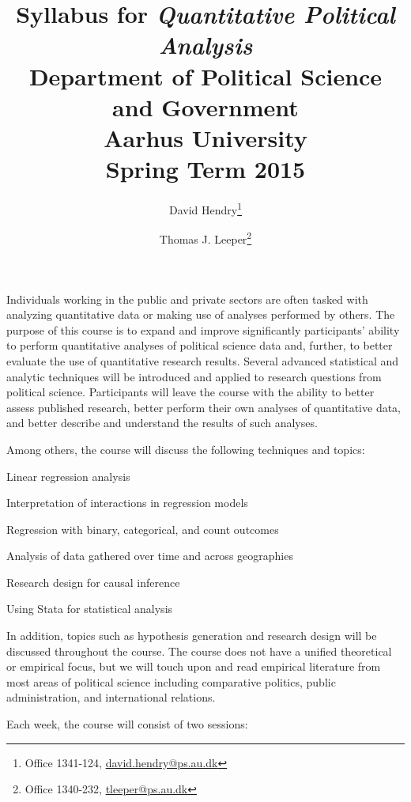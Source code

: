 \documentclass[11pt,a4paper]{article}
\title{Syllabus for \textit{Quantitative Political Analysis}\\Department of Political Science and Government\\Aarhus University\\Spring Term 2015}
\author{David Hendry\thanks{Office 1341-124, \href{mailto:david.hendry@ps.au.dk}{david.hendry@ps.au.dk}} \and
Thomas J. Leeper\thanks{Office 1340-232, \href{mailto:tleeper@ps.au.dk}{tleeper@ps.au.dk}}}
\begin{document}
\nobibliography*

\maketitle

\faketableofcontents


Individuals working in the public and private sectors are often tasked with analyzing quantitative data or making use of analyses performed by others. The purpose of this course is to expand and improve significantly participants' ability to perform quantitative analyses of political science data and, further, to better evaluate the use of quantitative research results. Several advanced statistical and analytic techniques will be introduced and applied to research questions from political science. Participants will leave the course with the ability to better assess published research, better perform their own analyses of quantitative data, and better describe and understand the results of such analyses. 

\vspace{1em}
Among others, the course will discuss the following techniques and topics:

\begin{itemize*}
\item Linear regression analysis
\item Interpretation of interactions in regression models
\item Regression with binary, categorical, and count outcomes
\item Analysis of data gathered over time and across geographies
\item Research design for causal inference 
\item Using Stata for statistical analysis
\end{itemize*}

In addition, topics such as hypothesis generation and research design will be discussed throughout the course. The course does not have a unified theoretical or empirical focus, but we will touch upon and read empirical literature from most areas of political science including comparative politics, public administration, and international relations.

\vspace{1em}
Each week, the course will consist of two sessions:\\
\end{document}
